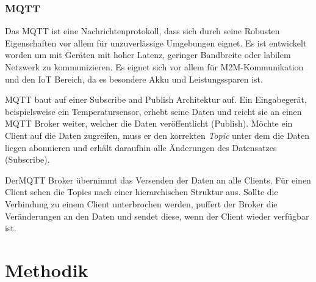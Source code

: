 \documentclass[a4paper, 12pt, oneside, toc=listofnumbered, bibliography=totoc]{scrbook}
\begin{document}
		\subsection{MQTT}
		
		Das \ac{MQTT} ist eine Nachrichtenprotokoll, dass sich durch seine Robusten Eigenschaften vor allem für unzuverlässige Umgebungen eignet. Es ist entwickelt worden um mit Geräten mit hoher Latenz, geringer Bandbreite oder labilem Netzwerk zu kommunizieren. Es eignet sich vor allem für \ac{M2M}-Kommunikation und den \ac{IoT} Bereich, da es besondere Akku und Leistungssparen ist. 
		
		\ac{MQTT} baut auf einer Subscribe and Publish Architektur auf. Ein Eingabegerät, beispielsweise ein Temperatursensor, erhebt seine Daten und reicht sie an einen MQTT Broker weiter, welcher die Daten veröffentlicht (Publish). Möchte ein Client auf die Daten zugreifen, muss er den korrekten \textit{Topic} unter dem die Daten liegen abonnieren und erhält daraufhin alle Änderungen des Datensatzes (Subscribe).
		
		Der\ac{MQTT} Broker übernimmt das Versenden der Daten an alle Clients. Für einen Client sehen die Topics nach einer hierarchischen Struktur aus. Sollte die Verbindung zu einem Client unterbrochen werden, puffert der Broker die Veränderungen an den Daten und sendet diese, wenn der Client wieder verfügbar ist.
		
		
\chapter{Methodik}\label{ch:Methodiken}
	
	
\end{document}
